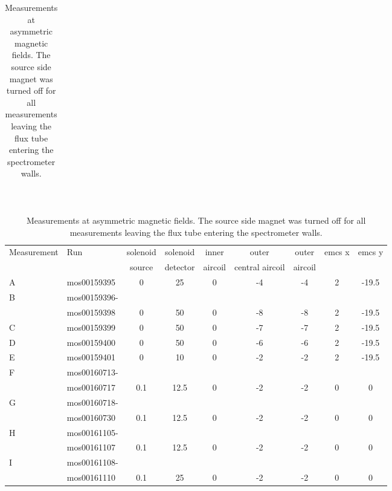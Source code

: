   \begin{table}
	\centering
		\begin{tabular}{c}
		\end{tabular}\\
		\begin{tabular}{|l|l|ccccccc|}
			\hline
			\centering
			
			Measurement &Run &  solenoid &solenoid &inner & outer &outer &emcs x	&emcs y\\
			& 	& source	& detector & aircoil & central aircoil & aircoil& &\\
			\hline
			A & mos00159395& 0&	25&	0&	-4&	-4&	2&	-19.5\\
			\hline
			 B & mos00159396-&&&&&&&\\
			& mos00159398 & 0 & 50& 0 & -8 & -8 & 2 & -19.5\\
			\hline
			C & mos00159399 & 0 & 50& 0 & -7 & -7 & 2 & -19.5\\
			\hline
			D & mos00159400 & 0 & 50& 0 & -6 & -6 & 2 & -19.5\\
			\hline
			E & mos00159401 & 0 & 10& 0 & -2 & -2 & 2 & -19.5\\
			\hline
			F & mos00160713-&&&&&&&\\
			& mos00160717& 0.1 & 12.5 & 0 & -2 & -2 & 0 & 0\\
			\hline
			G & mos00160718-&&&&&&&\\
			& mos00160730 & 0.1 & 12.5 & 0 & -2 & -2 & 0 & 0\\
			\hline
			H &mos00161105-&&&&&&&\\
			& mos00161107 & 0.1 & 12.5 & 0 & -2 & -2 & 0 & 0\\
			\hline
			I &mos00161108-&&&&&&&\\
			 & mos00161110 & 0.1 & 25 & 0 & -2 & -2 & 0 & 0\\
			\hline
		\end{tabular}
		\caption[Asymmetric magnetic field measurements]{Measurements at asymmetric magnetic fields. The source side magnet was turned off for all measurements leaving the flux tube entering the spectrometer walls.}
		\label{tab:analysis:asymmetricMagneticFields}
	\end{table}
